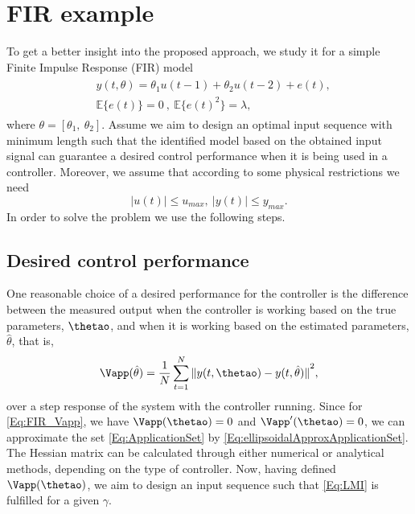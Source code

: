 \documentclass{ifacconf}
\begin{document}
\section{FIR example}
\label{FIR example}
To get a better insight into the proposed approach, we study it for a simple Finite Impulse Response (FIR) model
\begin{eqnarray} \label{Eq:FIR_Model}
\begin{split}
&y(t,\theta) = \theta_1 u(t-1) + \theta_2 u(t-2) + e(t),\\
&\mathbb{E}\{e(t)\} = 0 \ , \  \mathbb{E}\{e(t)^2\} = \lambda,
\end{split}
\end{eqnarray}
where $\theta =[\theta_1, \ \theta_2]$. Assume we aim to design an optimal input sequence with minimum length such that the identified model based on the obtained input signal can guarantee a desired control performance when it is being used in a controller. Moreover, we assume that according to some physical restrictions we need
\begin{equation}
|u(t)| \leq u_{max}, \ |y(t)| \leq y_{max}.
\end{equation}
In order to solve the problem we use the following steps.
\subsection{Desired control performance}
One reasonable choice of a desired performance for the controller is the difference between the measured output when the controller is working based on the true parameters, $\thetao$, and when it is working based on the estimated parameters, $\hat \theta$, that is,
\begin{equation}\label{Eq:FIR_Vapp}
\Vapp(\hat \theta) = \frac{1}{N} \sum_{t=1}^{N} {\| y(t,\thetao) - y(t,\hat \theta)  \|}^2,
\end{equation}
over a step response of the system with the controller running.
Since for \eqref{Eq:FIR_Vapp}, we have $\Vapp(\thetao) = 0$ and $\Vapp'(\thetao) = 0$,
we can approximate the set \eqref{Eq:ApplicationSet} by \eqref{Eq:ellipsoidalApproxApplicationSet}. The Hessian matrix can be calculated through either numerical or analytical methods, depending on the type of controller. Now, having defined $\Vapp(\thetao)$, we aim to design an input sequence such that \eqref{Eq:LMI} is fulfilled for a given $\gamma$.
\end{document}
